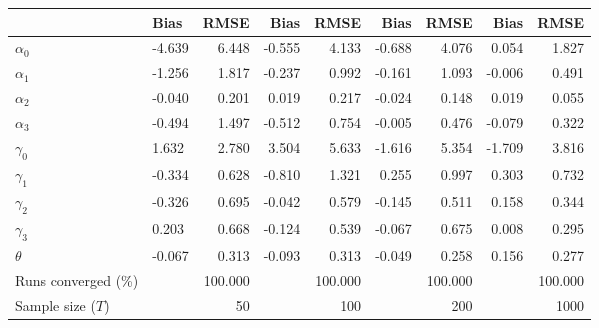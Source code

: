 
\begin{tabular}[t]{llrrrrrrr}
\toprule
  & Bias & RMSE & Bias & RMSE & Bias & RMSE & Bias & RMSE\\
\midrule
$\alpha_{0}$ & -4.639 & 6.448 & -0.555 & 4.133 & -0.688 & 4.076 & 0.054 & 1.827\\
$\alpha_{1}$ & -1.256 & 1.817 & -0.237 & 0.992 & -0.161 & 1.093 & -0.006 & 0.491\\
$\alpha_{2}$ & -0.040 & 0.201 & 0.019 & 0.217 & -0.024 & 0.148 & 0.019 & 0.055\\
$\alpha_{3}$ & -0.494 & 1.497 & -0.512 & 0.754 & -0.005 & 0.476 & -0.079 & 0.322\\
$\gamma_{0}$ & 1.632 & 2.780 & 3.504 & 5.633 & -1.616 & 5.354 & -1.709 & 3.816\\
$\gamma_{1}$ & -0.334 & 0.628 & -0.810 & 1.321 & 0.255 & 0.997 & 0.303 & 0.732\\
$\gamma_{2}$ & -0.326 & 0.695 & -0.042 & 0.579 & -0.145 & 0.511 & 0.158 & 0.344\\
$\gamma_{3}$ & 0.203 & 0.668 & -0.124 & 0.539 & -0.067 & 0.675 & 0.008 & 0.295\\
$\theta$ & -0.067 & 0.313 & -0.093 & 0.313 & -0.049 & 0.258 & 0.156 & 0.277\\
Runs converged (\%) &  & 100.000 &  & 100.000 &  & 100.000 &  & 100.000\\
Sample size ($T$) &  & 50 &  & 100 &  & 200 &  & 1000\\
\bottomrule
\end{tabular}
